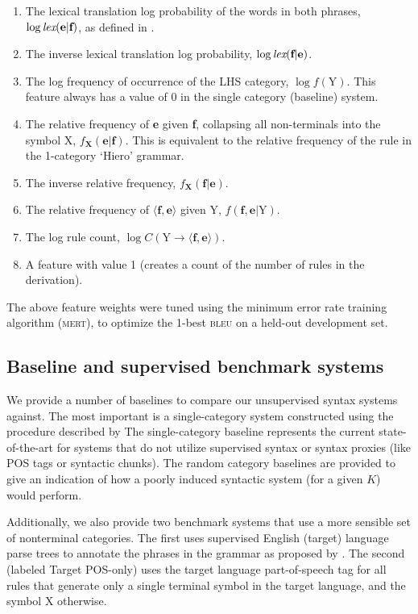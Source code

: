 \begin{enumerate}
\item The lexical translation log probability of the words in both phrases, $\log \textrm{{\emph lex}}(\textbf{e}|\textbf{f})$, as defined in \cite{Koehn2003}.
\item The inverse lexical translation log probability, $\log \textrm{{\emph lex}}(\textbf{f}|\textbf{e})$.
\item The log frequency of occurrence of the LHS category, $\log f(\textrm{Y})$. This feature always has a value of 0 in the single category (baseline) system.
\item The relative frequency of \textbf{e} given \textbf{f}, collapsing all non-terminals into the symbol X, $f_{\textbf{X}}(\textbf{e}|\textbf{f})$. This is equivalent to the relative frequency of the rule in the 1-category `Hiero' grammar.
\item The inverse relative frequency, $f_{\textbf{X}}(\textbf{f}|\textbf{e})$.
\item The relative frequency of $\langle \textbf{f}, \textbf{e} \rangle$ given Y, $f(\textbf{f}, \textbf{e} | \textrm{Y})$.
\item The log rule count, $\log C(\textrm{Y} \rightarrow \langle \textbf{f},\textbf{e} \rangle)$.
\item A feature with value 1 (creates a count of the number of rules in the derivation).
\end{enumerate}

\noindent The above feature weights were tuned using the minimum error rate training algorithm (\textsc{mert}), to optimize the 1-best \textsc{bleu} on a held-out development set.

\subsection{Baseline and supervised benchmark systems}

We provide a number of baselines to compare our unsupervised syntax systems against.  The most important is a single-category system constructed using the procedure described by \cite{chiang:2007} The single-category baseline represents the current state-of-the-art for systems that do not utilize supervised syntax or syntax proxies (like POS tags or syntactic chunks).  The random category baselines are provided to give an indication of how a poorly induced syntactic system (for a given $K$) would perform.

Additionally, we also provide two benchmark systems that use a more sensible set of nonterminal categories.  The first uses supervised English (target) language parse trees to annotate the phrases in the grammar as proposed by \cite{samt}.  The second (labeled Target POS-only) uses the target language part-of-speech tag for all rules that generate only a single terminal symbol in the target language, and the symbol X otherwise.

